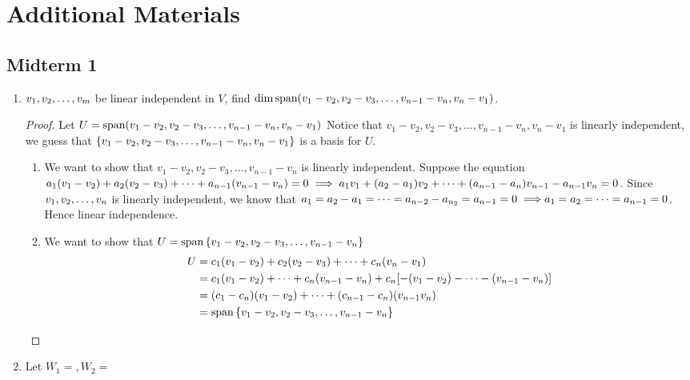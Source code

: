 \section*{Additional Materials}
\subsection*{Midterm 1}
\begin{enumerate}
    \item ${v}_1,{v}_2, \ldots, {v}_{m}$ be linear independent in $V$, find $\dim \text{span} (v_1 - v_2, v_2 - v_3, \ldots, v_{n-1} - v_n, v_n - v_1)$. 
    \begin{proof}
        Let $U = \text{span} ( v_1 - v_2, v_2 - v_3, \ldots, v_{n-1} - v_n, v_n - v_1 )$
        Notice that $v_1 - v_2, v_2 - v_3, \ldots, v_{n-1} - v_n, v_n - v_1$ is linearly independent, we guess that $\left\{ v_1 - v_2, v_2 - v_3, \ldots, v_{n-1} - v_n, v_n - v_1 \right\}$ is a basis for $U$. 
        \begin{enumerate} [label = \textit{Step \arabic*.}]
                \item We want to show that $ v_1 - v_2, v_2 - v_3, \ldots, v_{n-1} - v_n$ is linearly independent. Suppose the equation  $a_1(v_1 - v_2) + a_2(v_2 - v_3) + \cdots + a_{n-1} (v_{n-1} - v_n) = 0\\ \implies a_1 v_1  + (a_2 - a_1) v_2 + \cdots + (a_{n-1} - a_n)v_{n-1} - a_{n-1} v_n = 0$. Since ${v}_1,{v}_2, \ldots, {v}_{n}$ is linearly independent, we know that $a_1 = a_2 - a_1 = \cdots = a_{n - 2} - a_{n_2} = a_{n-1} = 0 \implies \\ a_1 = a_2 = \cdots = a_{n-1} = 0$. Hence linear independence.
                \item We want to show that $U = \text{span} \left\{  v_1 - v_2, v_2 - v_3, \ldots, v_{n-1} - v_n \right\}$ 
                \begin{align*}
                    U &= c_1(v_1 - v_2) + c_2(v_2 - v_3) + \cdots + c_n(v_n - v_1) \\
                    &= c_1(v_1 - v_2) + \cdots + c_n(v_{n-1} - v_n) + c_n[-(v_1 - v_2) - \cdots - (v_{n-1} - v_n)] \\
                    &= (c_1 - c_n)(v_1 - v_2) + \cdots + (c_{n - 1} - c_n)(v_{n-1}v_n) \\
                    &= \text{span} \left\{  v_1 - v_2, v_2 - v_3, \ldots, v_{n-1} - v_n \right\}
                \end{align*}
        \end{enumerate}
    \end{proof}
    \item Let $W_1  = , W_2 = $

\end{enumerate}
